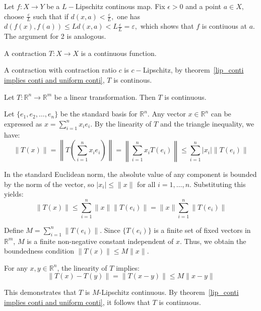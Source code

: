 \begin{pfbox}
    Let $f:X\to Y$ be a $L-$Lipschitz continous map. Fix $\epsilon>0$ and a point $a\in X,$ choose $\frac{\varepsilon}{L}$ such that
    if $d(x,a)<\frac{\varepsilon}{L},$ one has $d(f(x),f(a))\le Ld(x,a)<L\frac{\varepsilon}{L}=\varepsilon,$ which shows that $f$ is contiuous at $a$. 
    The argument for 2 is analogous.
\end{pfbox}

\begin{corollary}
A contraction $T:X\to X$ is a continuous function.
\end{corollary}

\begin{pfbox}
    A contraction with contraction ratio $c$ is $c-$Lipschitz, by theorem~\eqref{lip_conti implies conti and uniform conti}, $T$ is continous.
\end{pfbox}

\begin{theorem}
    Let $T: \mathbb{R}^n \to \mathbb{R}^m$ be a linear transformation. Then $T$ is continuous.
\label{linear_map_continuous}
\end{theorem}

\begin{pfbox}
    Let $\{e_1, e_2, \dots, e_n\}$ be the standard basis for $\mathbb{R}^n$. Any vector $x \in \mathbb{R}^n$ can be expressed as $x = \sum_{i=1}^n x_i e_i$. By the linearity of $T$ and the triangle inequality, we have:
    $$ \|T(x)\| = \left\|T\left(\sum_{i=1}^n x_i e_i\right)\right\| = \left\|\sum_{i=1}^n x_i T(e_i)\right\| \le \sum_{i=1}^n |x_i| \|T(e_i)\| $$
    
    In the standard Euclidean norm, the absolute value of any component is bounded by the norm of the vector, so $|x_i| \le \|x\|$ for all $i=1, \dots, n$. Substituting this yields:
    $$ \|T(x)\| \le \sum_{i=1}^n \|x\| \|T(e_i)\| = \|x\| \sum_{i=1}^n \|T(e_i)\| $$
    
    Define $M = \sum_{i=1}^n \|T(e_i)\|$. Since $\{T(e_i)\}$ is a finite set of fixed vectors in $\mathbb{R}^m$, $M$ is a finite non-negative constant independent of $x$. Thus, we obtain the boundedness condition $\|T(x)\| \le M\|x\|$. 
    
    For any $x, y \in \mathbb{R}^n$, the linearity of $T$ implies:
    $$ \|T(x) - T(y)\| = \|T(x - y)\| \le M\|x - y\| $$
    
    This demonstrates that $T$ is $M$-Lipschitz continuous. By theorem~\eqref{lip_conti implies conti and uniform conti}, it follows that $T$ is continuous.
\end{pfbox}


